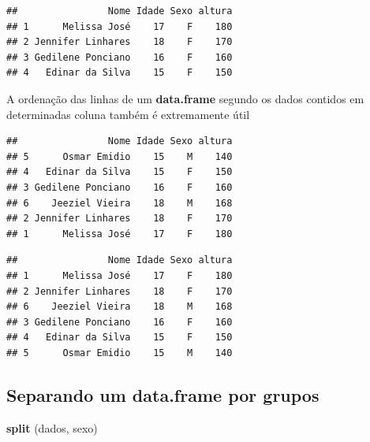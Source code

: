 \documentclass[]{book}
\newenvironment{Shaded}{\begin{snugshade}}{\end{snugshade}}
\newcommand{\KeywordTok}[1]{\textcolor[rgb]{0.13,0.29,0.53}{\textbf{#1}}}
\newcommand{\NormalTok}[1]{#1}
\newcommand{\OperatorTok}[1]{\textcolor[rgb]{0.81,0.36,0.00}{\textbf{#1}}}
\begin{document}
\begin{verbatim}
##                Nome Idade Sexo altura
## 1      Melissa José    17    F    180
## 2 Jennifer Linhares    18    F    170
## 3 Gedilene Ponciano    16    F    160
## 4   Edinar da Silva    15    F    150
\end{verbatim}

A ordenação das linhas de um \textbf{data.frame} segundo os dados contidos em determinadas coluna também é extremamente útil

\begin{Shaded}
\end{Shaded}

\begin{verbatim}
##                Nome Idade Sexo altura
## 5      Osmar Emidio    15    M    140
## 4   Edinar da Silva    15    F    150
## 3 Gedilene Ponciano    16    F    160
## 6    Jeeziel Vieira    18    M    168
## 2 Jennifer Linhares    18    F    170
## 1      Melissa José    17    F    180
\end{verbatim}

\begin{Shaded}
\end{Shaded}

\begin{verbatim}
##                Nome Idade Sexo altura
## 1      Melissa José    17    F    180
## 2 Jennifer Linhares    18    F    170
## 6    Jeeziel Vieira    18    M    168
## 3 Gedilene Ponciano    16    F    160
## 4   Edinar da Silva    15    F    150
## 5      Osmar Emidio    15    M    140
\end{verbatim}

\hypertarget{separando-um-data.frame-por-grupos}{%
\subsection{Separando um data.frame por grupos}\label{separando-um-data.frame-por-grupos}}

\begin{Shaded}
\begin{Highlighting}[]
\KeywordTok{split}\NormalTok{ (dados, sexo)}
\end{Highlighting}
\end{Shaded}
\end{document}
